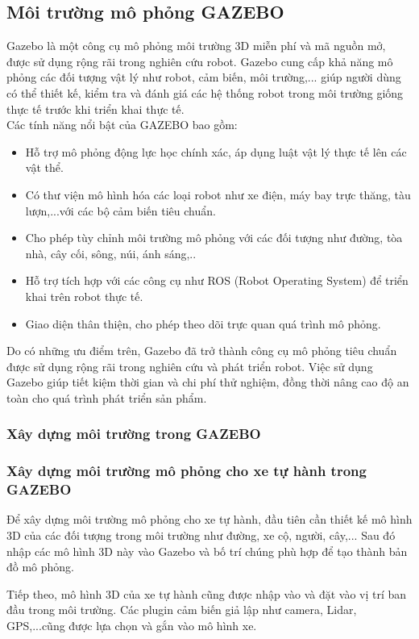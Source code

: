 \subsection{Môi trường mô phỏng \textbf{GAZEBO}}
Gazebo là một công cụ mô phỏng môi trường 3D miễn phí và mã nguồn mở, được sử dụng rộng rãi trong nghiên cứu robot. Gazebo cung cấp khả năng mô phỏng các đối tượng vật lý như robot, cảm biến, môi trường,... giúp người dùng có thể thiết kế, kiểm tra và đánh giá các hệ thống robot trong môi trường giống thực tế trước khi triển khai thực tế.\\
Các tính năng nổi bật của GAZEBO bao gồm:
\begin{itemize}
    \item Hỗ trợ mô phỏng động lực học chính xác, áp dụng luật vật lý thực tế lên các vật thể.
    \item Có thư viện mô hình hóa các loại robot như xe điện, máy bay trực thăng, tàu lượn,...với các bộ cảm biến tiêu chuẩn.
    \item Cho phép tùy chỉnh môi trường mô phỏng với các đối tượng như đường, tòa nhà, cây cối, sông, núi, ánh sáng,..
    \item Hỗ trợ tích hợp với các công cụ như ROS (Robot Operating System) để triển khai trên robot thực tế.
    \item Giao diện thân thiện, cho phép theo dõi trực quan quá trình mô phỏng.
\end{itemize}
Do có những ưu điểm trên, Gazebo đã trở thành công cụ mô phỏng tiêu chuẩn được sử dụng rộng rãi trong nghiên cứu và phát triển robot. Việc sử dụng Gazebo giúp tiết kiệm thời gian và chi phí thử nghiệm, đồng thời nâng cao độ an toàn cho quá trình phát triển sản phẩm.



\subsubsection{Xây dựng môi trường trong GAZEBO}
\subsubsection*{Xây dựng môi trường mô phỏng cho xe tự hành trong GAZEBO}

Để xây dựng môi trường mô phỏng cho xe tự hành, đầu tiên cần thiết kế mô hình 3D của các đối tượng trong môi trường như đường, xe cộ, người, cây,... Sau đó nhập các mô hình 3D này vào Gazebo và bố trí chúng phù hợp để tạo thành bản đồ mô phỏng.

\noindent Tiếp theo, mô hình 3D của xe tự hành cũng được nhập vào và đặt vào vị trí ban đầu trong môi trường. Các plugin cảm biến giả lập như camera, Lidar, GPS,...cũng được lựa chọn và gắn vào mô hình xe.\\

